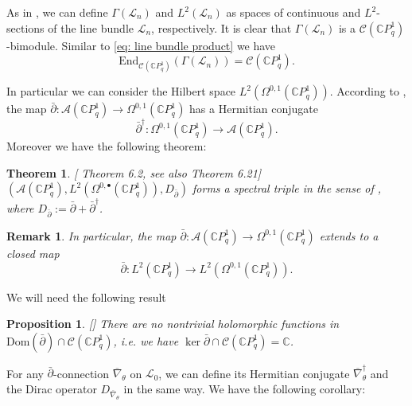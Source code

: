\documentclass[12pt]{article}
\newtheorem{remark}[definition]{Remark}
\newtheorem{proposition}[definition]{Proposition}
\newtheorem{theorem}[definition]{Theorem}
\numberwithin{equation}{section}
\def\End{{\mathrm {End}}}
\def\Dom{{\mathrm {Dom}}}
\def\pb{\bar{\partial}}
\def\C{{\mathbb C}}
\def\A{\mathcal{A}}
\def\L{\mathcal{L}}
\begin{document}
As in \cite[Section 3.3]{khalkhali2011holomorphic}, we can define $\Gamma(\L_n)$  and $L^2(\L_n)$ as spaces of continuous and $L^2$-sections of the line bundle $\L_n$, respectively. It is clear that  $\Gamma(\L_n)$ is a $\mathcal{C}(\C P^1_q)$-bimodule. Similar to \eqref{eq: line bundle product} we have
\begin{equation}
\End_{\mathcal{C}(\C P^1_q)}(\Gamma(\L_n))=\mathcal{C}(\C P^1_q).
\end{equation}

In particular we can consider the Hilbert space $L^2(\Omega^{0,1}(\C P^1_q))$. According to \cite[Section 7.1]{d2013geometry}, the map
$\pb: \A(\C P^1_q)\to \Omega^{0,1}(\C P^1_q)$ has a Hermitian conjugate
\begin{equation}
\pb^{\dagger}:  \Omega^{0,1}(\C P^1_q)\to \A(\C P^1_q).
\end{equation}
Moreover we have the following theorem:

\begin{theorem}\label{thm: spectral triple}[\cite{d2010dirac} Theorem 6.2, see also \cite{das2020dolbeault} Theorem 6.21]
    $(\A(\C P^1_q), L^2(\Omega^{0,\bullet}(\C P^1_q)), D_{\pb})$ forms a spectral triple in the sense of \cite{connes1995noncommutative}, where $D_{\pb}:=\pb+\pb^{\dagger}$.
\end{theorem}

\begin{remark}\label{rmk: db closed map}
In particular, the map $\pb: \A(\C P^1_q)\to \Omega^{0,1}(\C P^1_q)$ extends to a closed map
$$\pb: L^2(\C P^1_q)\to L^2(\Omega^{0,1}(\C P^1_q)).$$
\end{remark}

We will need the following result
\begin{proposition}\label{prop: kernel of pb in completion}[\cite[Corollary 4.3]{khalkhali2011holomorphic}]
    There are no nontrivial holomorphic functions in $\Dom(\pb)\cap \mathcal{C}(\C P^1_q)$, i.e. we have $\ker\pb\cap \mathcal{C}(\C P^1_q)=\C $.
\end{proposition}

For any $\pb$-connection $\overline{\nabla}_{\theta}$ on $\L_0$, we  can define its Hermitian conjugate $\overline{\nabla}_{\theta}^{\dagger}$ and the Dirac operator $D_{\overline{\nabla}_{\theta}}$ in the same way. We have the following corollary:
\end{document}
